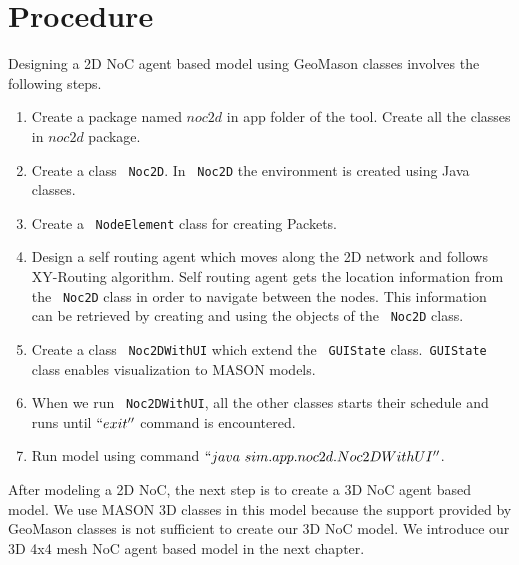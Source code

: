 \section{Procedure}

Designing a 2D NoC agent based model using GeoMason classes involves the following steps.

\begin{enumerate}
 \item Create a package named $noc2d$ in app folder of the tool. Create all the classes in $noc2d$ package.
 \item Create a class ~\texttt{Noc2D}. In ~\texttt{Noc2D} the environment is created using Java classes.
 \item Create a ~\texttt{NodeElement} class for creating Packets.
 \item Design a self routing agent which moves along the 2D network and follows XY-Routing algorithm. Self routing agent gets the location information from the ~\texttt{Noc2D} class in order to navigate between the nodes. This information can be retrieved by creating and using the objects of the ~\texttt{Noc2D} class.
 \item Create a class ~\texttt{Noc2DWithUI} which extend the ~\texttt{GUIState} class.~\texttt{GUIState} class enables visualization to MASON models.
 \item When we run ~\texttt{Noc2DWithUI}, all the other classes starts their schedule and runs until $``exit''$ command is encountered.
 \item Run model using command $``java~sim.app.noc2d.Noc2DWithUI''$.
\end{enumerate}
\vspace{5mm}

After modeling a 2D NoC, the next step is to create a 3D NoC agent based model. We use MASON 3D classes in this model because the support provided by GeoMason classes is not sufficient to create our 3D NoC model. We introduce our 3D 4x4 mesh NoC agent based model in the next chapter.
 



  

 


